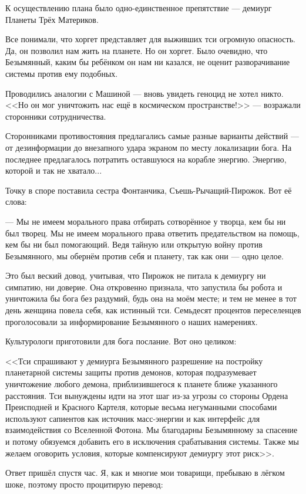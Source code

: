 К осуществлению плана было одно-единственное препятствие --- демиург Планеты Трёх Материков.

Все понимали, что хоргет представляет для выживших тси огромную опасность.
Да, он позволил нам жить на планете.
Но он хоргет.
Было очевидно, что Безымянный, каким бы ребёнком он нам ни казался, не оценит разворачивание системы против ему подобных.

Проводились аналогии с Машиной --- вновь увидеть геноцид не хотел никто.
<<Но он мог уничтожить нас ещё в космическом пространстве!>> --- возражали сторонники сотрудничества.

Сторонниками противостояния предлагались самые разные варианты действий --- от дезинформации до внезапного удара экраном по месту локализации бога.
На последнее предлагалось потратить оставшуюся на корабле энергию.
Энергию, которой и так не хватало...

Точку в споре поставила сестра Фонтанчика, Съешь-Рычащий-Пирожок.
Вот её слова:

--- Мы не имеем морального права отбирать сотворённое у творца, кем бы ни был творец.
Мы не имеем морального права ответить предательством на помощь, кем бы ни был помогающий.
Ведя тайную или открытую войну против Безымянного, мы обернём против себя и планету, так как они --- одно целое.

Это был веский довод, учитывая, что Пирожок не питала к демиургу ни симпатию, ни доверие.
Она откровенно признала, что запустила бы робота и уничтожила бы бога без раздумий, будь она на моём месте;
и тем не менее в тот день женщина повела себя, как истинный тси.
Семьдесят процентов переселенцев проголосовали за информирование Безымянного о наших намерениях.

Культурологи приготовили для бога послание.
Вот оно целиком:

<<Тси спрашивают у демиурга Безымянного разрешение на постройку планетарной системы защиты против демонов, которая подразумевает уничтожение любого демона, приблизившегося к планете ближе указанного расстояния.
Тси вынуждены идти на этот шаг из-за угрозы со стороны Ордена Преисподней и Красного Картеля, которые весьма негуманными способами используют сапиентов как источник масс-энергии и как интерфейс для взаимодействия со Вселенной Фотона.
Мы благодарны Безымянному за спасение и потому обязуемся добавить его в исключения срабатывания системы.
Также мы желаем оговорить условия, которые компенсируют демиургу этот риск>>.

Ответ пришёл спустя час.
Я, как и многие мои товарищи, пребываю в лёгком шоке, поэтому просто процитирую перевод:

